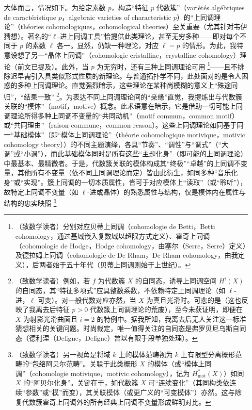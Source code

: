 大体而言，情况如下。为给定素数 $p$，构造“特征 $p$ 代数簇”（variétés algébriques de caractéristique $p$，algebraic varieties of characteristic $p$）的“上同调理论”（théories cohomologiques，cohomological theories）至关重要（尤其针对韦伊猜想）。著名的“$\ell$-进上同调工具”恰提供此类理论，甚至无穷多种——即对每个不同于 $p$ 的素数 $\ell$ 各一。显然，仍缺一种理论，对应 $\ell = p$ 的情形。为此，我特意设想了另一“晶体上同调”（cohomologie cristalline，crystalline cohomology）理论（前文已提及）。此外，当 $p$ 为无穷时，还有三种上同调理论可用 \footnote{（致数学读者）分别对应贝蒂上同调（cohomologie de Betti，Betti cohomology，通过基域嵌入复数域以超限方式定义）、霍奇上同调（cohomologie de Hodge，Hodge cohomology，由塞尔（Serre，Serre）定义）及德拉姆上同调（cohomologie de De Rham，De Rham cohomology，由我定义），后两者始于五十年代（贝蒂上同调则始于上世纪）。}——且不排除迟早需引入具类似形式性质的新理论。与普通拓扑学不同，此处面对的是令人困惑的多种上同调理论。直觉强烈暗示，这些理论在某种尚模糊的意义上“殊途同归”，“结果一致” \footnote{（致数学读者）例如，若 $f$ 为代数簇 $X$ 的自同态，诱导上同调空间 $H^{i}(X)$ 的自同态，其“特征多项式”应具整数系数，不依赖特定上同调理论（如 $\ell$-进，$\ell$ 可变）。对一般代数对应亦然，当 $X$ 为真且光滑时。可悲的是（这也反映了我离去后特征 $p>0$ 代数簇上同调理论的荒废），至今未获证明，即便在 $X$ 为射影光滑曲面且 $i=2$ 的特例中。据我所知，我离去后无人关注这一标准猜想相关的关键问题。时尚裁定，唯一值得关注的自同态是弗罗贝尼乌斯自同态（德利涅（Deligne，Deligne）曾以有限手段单独处理）。}。为表达不同上同调理论间的“亲缘”直觉，我提炼出与代数簇关联的“模体”（motif，motive）概念。此术语意在暗示，它是借助一切可能上同调理论所得多种上同调不变量的“共同动机”（motif commun，common motif）或“共同理由”（raison commune，common reason）。这些上同调理论如同基于同一“基础模体”（即“模体上同调理论”（théorie cohomologique motivique，motivic cohomology theory））的不同主题演绎，各具“节奏”、“调性”与“调式”（“大调”或“小调”），而此基础模体同时是所有这些“主题化身”（即可能的上同调理论）中最基本、最精微者。于是，代数簇关联的模体构成其“终极”“卓越”的上同调不变量，其他所有不变量（依不同上同调理论而定）皆由此衍生，如同多种“音乐化身”或“实现”。簇上同调的一切本质属性，皆可于对应模体上“读取”（或“聆听”），故特定上同调不变量（如 $\ell$-进或晶体）的熟悉属性与结构，仅是模体内在属性与结构的忠实映照 \footnote{（致数学读者）另一视角是将域 $k$ 上的模体范畴视为 $k$ 上有限型分离概形范畴的“包络阿贝尔范畴”。关联于此类概形 $X$ 的模体（或“模体上同调”（cohomologie motivique，motivic cohomology），记为 $H_{\text{mot}}^{*}(X)$）如同 $X$ 的“阿贝尔化身”。关键在于，如代数簇 $X$ 可“连续变化”（其同构类依连续“参数”或“模”而变），其关联模体（或更广义的“可变模体”）亦然。这与除复代数簇霍奇上同调外的所有经典上同调不变量形成鲜明对比。

}
